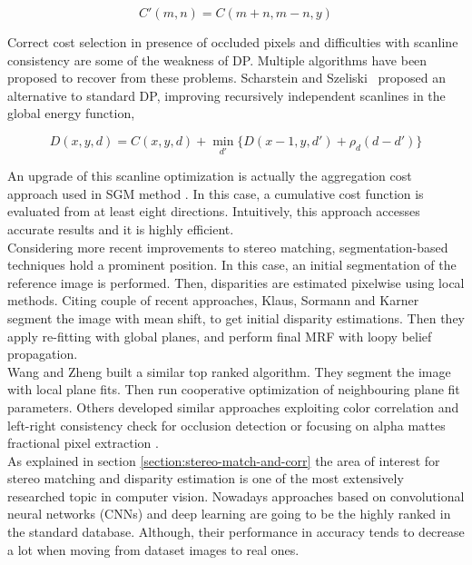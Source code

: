 \begin{equation}
\label{eqn:dynamicprog}
	C'(m,n) = C(m + n, m - n, y)
\end{equation}

Correct cost selection in presence of occluded pixels and difficulties with scanline consistency are some of the weakness of DP.
Multiple algorithms have been proposed to recover from these problems. 
Scharstein and Szeliski~\cite{Scharstein2001} proposed an alternative to standard DP, improving recursively independent scanlines in the global energy function,

\begin{equation}
\label{eqn:DPoptimization}
	D(x,y,d) = C(x,y,d) + \min_{d'}\{ D(x - 1, y, d') + \rho_{d} (d - d') \}
\end{equation}

An upgrade of this scanline optimization is actually the aggregation cost approach used in SGM method \cite{Hirschmuller2008}.
In this case, a cumulative cost function is evaluated from at least eight directions.
Intuitively, this approach accesses accurate results and it is highly efficient. \\
Considering more recent improvements to stereo matching, segmentation-based techniques hold a prominent position.
In this case, an initial segmentation of the reference image is performed.
Then, disparities are estimated pixelwise using local methods.
Citing couple of recent approaches, Klaus, Sormann and Karner \cite{Klaus2006} segment the image with mean shift, to get initial disparity estimations. 
Then they apply re-fitting with global planes, and perform final MRF with loopy belief propagation. \\
Wang and Zheng \cite{Wang2008} built a similar top ranked algorithm.
They segment the image with local plane fits. 
Then run cooperative optimization of neighbouring plane fit parameters. 
Others developed similar approaches exploiting color correlation and left-right consistency check for occlusion detection \cite{yang2008stereo} or focusing on alpha mattes fractional pixel extraction \cite{bleyer2009stereo}.\\
As explained in section \ref{section:stereo-match-and-corr} the area of interest for stereo matching and disparity estimation is one of the most extensively researched topic in computer vision.
Nowadays approaches based on convolutional neural networks (CNNs) and deep learning are going to be the highly ranked in the standard database.
Although, their performance in accuracy tends to decrease a lot when moving from dataset images to real ones.\\
